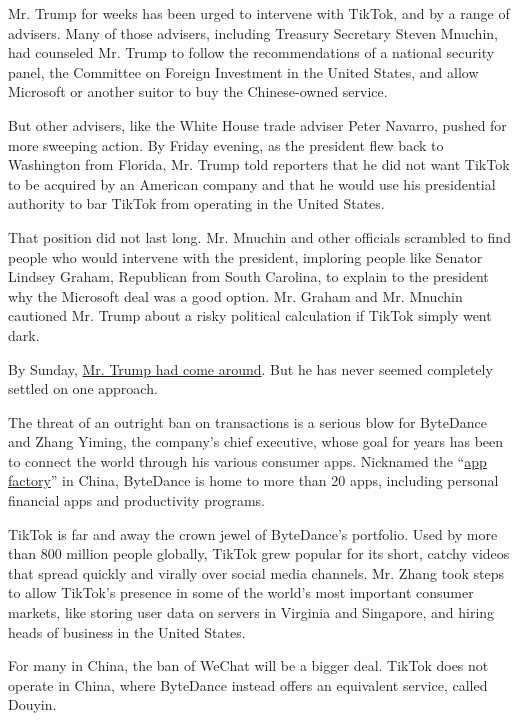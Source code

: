 Mr. Trump for weeks has been urged to intervene with TikTok, and by a
range of advisers. Many of those advisers, including Treasury Secretary
Steven Mnuchin, had counseled Mr. Trump to follow the recommendations of
a national security panel, the Committee on Foreign Investment in the
United States, and allow Microsoft or another suitor to buy the
Chinese-owned service.

But other advisers, like the White House trade adviser Peter Navarro,
pushed for more sweeping action. By Friday evening, as the president
flew back to Washington from Florida, Mr. Trump told reporters that he
did not want TikTok to be acquired by an American company and that he
would use his presidential authority to bar TikTok from operating in the
United States.

That position did not last long. Mr. Mnuchin and other officials
scrambled to find people who would intervene with the president,
imploring people like Senator Lindsey Graham, Republican from South
Carolina, to explain to the president why the Microsoft deal was a good
option. Mr. Graham and Mr. Mnuchin cautioned Mr. Trump about a risky
political calculation if TikTok simply went dark.

By Sunday,
\href{https://www.nytimes.com/2020/08/02/business/economy/trump-tiktok-china-national-security.html}{Mr.
Trump had come around}. But he has never seemed completely settled on
one approach.

The threat of an outright ban on transactions is a serious blow for
ByteDance and Zhang Yiming, the company's chief executive, whose goal
for years has been to connect the world through his various consumer
apps. Nicknamed the
``\href{https://qz.com/1803609/all-the-apps-run-by-tiktoks-chinese-owner-bytedance/\#:~:text=Although\%20most\%20often\%20described\%20as,news\%20aggregator\%20to\%20productivity\%20management}{app
factory}'' in China, ByteDance is home to more than 20 apps, including
personal financial apps and productivity programs.

TikTok is far and away the crown jewel of ByteDance's portfolio. Used by
more than 800 million people globally, TikTok grew popular for its
short, catchy videos that spread quickly and virally over social media
channels. Mr. Zhang took steps to allow TikTok's presence in some of the
world's most important consumer markets, like storing user data on
servers in Virginia and Singapore, and hiring heads of business in the
United States.

For many in China, the ban of WeChat will be a bigger deal. TikTok does
not operate in China, where ByteDance instead offers an equivalent
service, called Douyin.


